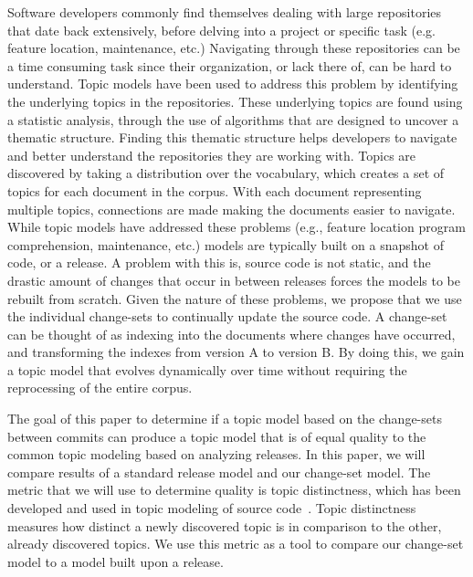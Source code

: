Software developers commonly find themselves dealing with large repositories that date back extensively, before delving into a project or specific task (e.g. feature location, maintenance, etc.)
Navigating through these repositories can be a time consuming task since their organization, or lack there of, can be hard to understand.
Topic models have been used to address this problem by identifying the underlying topics in the repositories.
These underlying topics are found using a statistic analysis, through the use of algorithms that are designed to uncover a thematic structure.
Finding this thematic structure helps developers to navigate and better understand the repositories they are working with.
Topics are discovered by taking a distribution over the vocabulary, which creates a set of topics for each document in the corpus.
With each document representing multiple topics, connections are made making the documents easier to navigate.
While topic models have addressed these problems (e.g., feature location program comprehension, maintenance, etc.) models are typically built on a snapshot of code, or a release.
A problem with this is, source code is not static, and the drastic amount of changes that occur in between releases forces the models to be rebuilt from scratch.
Given the nature of these problems, we propose that we use the individual change-sets to continually update the source code.
A change-set can be thought of as indexing into the documents where changes have occurred, and transforming the indexes from version A to version B.
By doing this, we gain a topic model that evolves dynamically over time without requiring the reprocessing of the entire corpus.

The goal of this paper to determine if a topic model based on the change-sets between commits can produce a topic model that is of equal quality to the common topic modeling based on analyzing releases.
In this paper, we will compare results of a standard release model and our change-set model.
The metric that we will use to determine quality is topic distinctness,
which has been developed and used in topic modeling of source
code~\cite{Wei-etal:2010, Thomas-etal:2011, Chuang-etal:2012}.
Topic distinctness measures how distinct a newly discovered topic is in
comparison to the other, already discovered topics.
We use this metric as a  tool to compare our change-set model to a model built upon a release.





